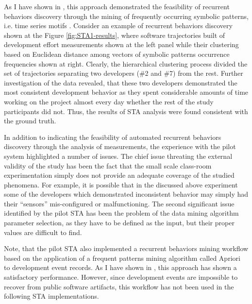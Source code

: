 As I have shown in \cite{csdl2-10-09}, this approach demonstrated the feasibility of recurrent behaviors discovery 
through the mining of frequently occurring symbolic patterns, i.e. time series motifs \cite{sax}. 
Consider an example of recurrent behaviors discovery shown at the Figure \ref{fig:STA1-results}, where software 
trajectories built of development effort measurements shown at the left panel while their clustering based on Euclidean 
distance among vectors of symbolic patterns occurrence frequencies shown at right. Clearly, the hierarchical clustering 
process divided the set of trajectories separating two developers (\#2 and \#7) from the rest. 
Further investigation of the data revealed, that these two developers demonstrated the most consistent development 
behavior as they spent considerable amounts of time working on the project almost every day whether the rest of the 
study participants did not. 
Thus, the results of STA analysis were found consistent with the ground truth.

In addition to indicating the feasibility of automated recurrent behaviors discovery through the analysis of measurements, 
the experience with the pilot system highlighted a number of issues.
The chief issue threating the external validity of the study has been the fact that the small scale class-room experimentation 
simply does not provide an adequate coverage of the studied phenomena. 
For example, it is possible that in the discussed above experiment some of the developers which demonstrated inconsistent 
behavior may simply had their ``sensors'' mis-configured or malfunctioning.
The second significant issue identified by the pilot STA has been the problem of the data mining algorithm parameter selection, 
as they have to be defined as the input, but their proper values are difficult to find.

Note, that the pilot STA also implemented a recurrent behaviors mining workflow based on the application of 
a frequent patterns mining algorithm called Apriori \cite{citeulike:775528} to development event records. 
As I have shown in \cite{citeulike:13159603}, this approach has shown a satisfactory performance. 
However, since development events are impossible to recover from public software artifacts, this workflow has not been 
used in the following STA implementations.

